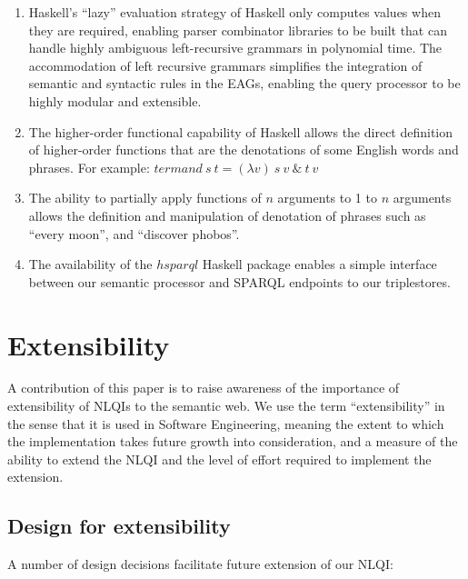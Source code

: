 \documentclass[../main.tex]{subfiles}
\begin{document}
\begin{refsection}
\begin{enumerate}
	\setlength\itemsep{0em}
	\item Haskell's ``lazy'' evaluation strategy of Haskell only computes values when they are required, enabling parser combinator
	libraries to be built that can handle highly ambiguous left-recursive grammars in polynomial time. The accommodation of left recursive
	grammars simplifies the integration of semantic and syntactic rules in the EAGs, enabling the query processor to be highly modular and extensible.
	\item The higher-order functional capability of Haskell allows the direct definition of higher-order
	functions that are the denotations of some English words and phrases. For example: $ \mathit{termand}\ s\ t = (\lambda v)\ s\ v\ \&\ t\ v  $
	\item The ability to partially apply functions of $n$ arguments to 1 to $n$ arguments allows the
	definition and manipulation of denotation of phrases such as ``every moon'', and ``discover
	phobos''.
	\item The availability of the $\mathit{hsparql}$ \cite{hsparql} Haskell package enables a simple interface between our
	semantic processor and SPARQL endpoints to our triplestores.
\end{enumerate}

\section{Extensibility}
\label{ext:extensible}

A contribution of this paper is to raise awareness of the importance of extensibility of NLQIs to
the semantic web. We use the term ``extensibility'' in the sense that it is used in Software Engineering,
meaning the extent to which the implementation takes future growth into consideration, and a
measure of the ability to extend the NLQI and the level of effort required to implement the extension.


\subsection{Design for extensibility}

A number of design decisions facilitate future extension of our NLQI:


\end{refsection}
\end{document}
